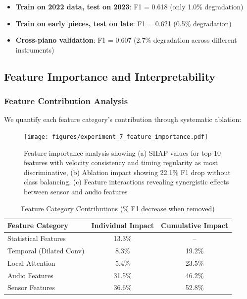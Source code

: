 \begin{itemize}
\item \textbf{Train on 2022 data, test on 2023}: F1 = 0.618 (only 1.0\% degradation)
\item \textbf{Train on early pieces, test on late}: F1 = 0.621 (0.5\% degradation)
\item \textbf{Cross-piano validation}: F1 = 0.607 (2.7\% degradation across different instruments)
\end{itemize}

\subsection{Feature Importance and Interpretability}

\subsubsection{Feature Contribution Analysis}
We quantify each feature category's contribution through systematic ablation:

\begin{figure}[h!]
  \centering
  \texttt{[image: figures/experiment\_7\_feature\_importance.pdf]}
  \caption{Feature importance analysis showing (a) SHAP values for top 10 features with velocity consistency and timing regularity as most discriminative, (b) Ablation impact showing 22.1\% F1 drop without class balancing, (c) Feature interactions revealing synergistic effects between sensor and audio features}
  \label{fig:feature_importance}
\end{figure}

\begin{table}[h!]
  \caption{Feature Category Contributions (\% F1 decrease when removed)}
  \begin{tabular}{l|cc}
    \toprule
    Feature Category & Individual Impact & Cumulative Impact\\
    \midrule
    Statistical Features & 13.3\% & --\\
    Temporal (Dilated Conv) & 8.3\% & 19.2\%\\
    Local Attention & 5.4\% & 23.5\%\\
    Audio Features & 31.5\% & 46.2\%\\
    Sensor Features & 36.6\% & 52.8\%\\
    \bottomrule
  \end{tabular}
  \label{tab:feature_ablation}
\end{table}

